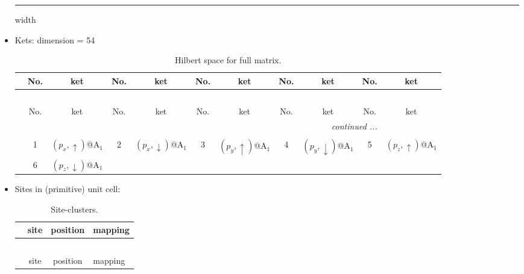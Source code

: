\documentclass[fleqn,10pt,landscape]{article}
\begin{document}
\begin{itemize}
 \hfil \hrule height 1mm width \textwidth \hfil

\item Kets: dimension = 54
\begin{center}
\renewcommand{\arraystretch}{1.3}
\begin{longtable}{c|cc|cc|cc|cc|cc}
\caption{Hilbert space for full matrix.}
 \\
 \hline \hline
 & No. & ket & No. & ket & No. & ket & No. & ket & No. & ket \\ \hline \endfirsthead

\multicolumn{10}{l}{\tablename\ \thetable{}} \\
 \hline \hline
 & No. & ket & No. & ket & No. & ket & No. & ket & No. & ket \\ \hline \endhead

 \hline \hline
\multicolumn{10}{r}{\footnotesize\it continued ...} \\ \endfoot

 \hline \hline
\multicolumn{10}{r}{} \\ \endlastfoot

 & 1 & $(p_{x},\uparrow)$@A$_{1}$ & 2 & $(p_{x},\downarrow)$@A$_{1}$ & 3 & $(p_{y},\uparrow)$@A$_{1}$ & 4 & $(p_{y},\downarrow)$@A$_{1}$ & 5 & $(p_{z},\uparrow)$@A$_{1}$ \\
& 6 & $(p_{z},\downarrow)$@A$_{1}$ &  &  &  &  &  &  &  &  \\
\end{longtable}
\end{center}

\item Sites in (primitive) unit cell:
\begin{center}
\renewcommand{\arraystretch}{1.3}
\begin{longtable}{cc|c|l}
\caption{Site-clusters.}
 \\
 \hline \hline
 & site & position & mapping \\ \hline \endfirsthead

\multicolumn{3}{l}{\tablename\ \thetable{}} \\
 \hline \hline
 & site & position & mapping \\ \hline \endhead


\end{longtable}
\end{center}
\end{itemize}
\end{document}
